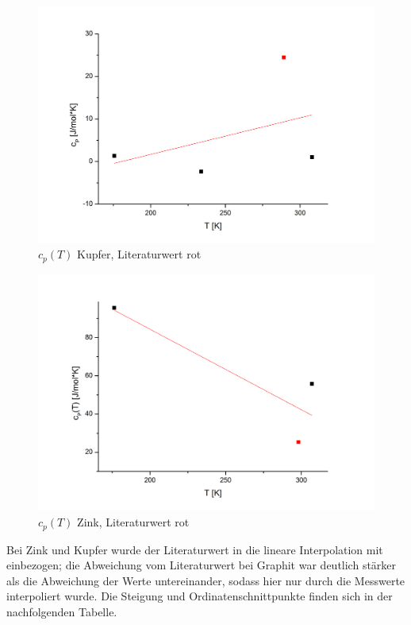 \documentclass[12pt,a4paper,titlepage,headinclude,bibtotoc]{scrartcl}
\begin{document}
\begin{figure} [h!]
\begin{center}
\includegraphics[scale=0.5]{cp(T)KupferNeu.png} \end{center}
\caption{$c_p(T)$ Kupfer, Literaturwert rot}
\end{figure} 
\FloatBarrier  

\begin{figure} [h!]
\begin{center}
\includegraphics[scale=0.5]{Zinkcp(T)Neu.png} \end{center}
\caption{$c_p(T)$ Zink, Literaturwert rot}
\end{figure}    
\FloatBarrier 

      
Bei Zink und Kupfer wurde der Literaturwert in die lineare Interpolation mit einbezogen; die Abweichung vom Literaturwert bei Graphit war deutlich stärker als die Abweichung der Werte untereinander, sodass hier nur durch die Messwerte interpoliert wurde. Die Steigung und Ordinatenschnittpunkte finden sich in der nachfolgenden Tabelle.\\
\end{document}
